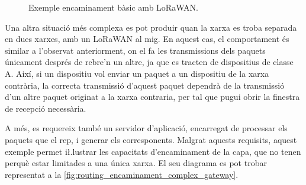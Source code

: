 \documentclass{tfgitic}[2024/07/01]
\begin{document}
{\begin{figure}[h]
    \caption{Exemple encaminament bàsic amb  LoRaWAN.}
    \label{fig:routing_encaminament_basic_gateway}
\end{figure}

Una altra situació més complexa es pot produir quan la xarxa es troba separada en dues xarxes, amb un  LoRaWAN al mig. En aquest cas, el comportament és similar a l'observat anteriorment, on el  fa les transmissions dels paquets únicament després de rebre'n un altre, ja que es tracten de dispositius de classe A. Així, si un dispositiu vol enviar un paquet a un dispositiu de la xarxa contrària, la correcta transmissió d'aquest paquet dependrà de la transmissió d'un altre paquet originat a la xarxa contraria, per tal que pugui obrir la finestra de recepció necessària.

A més, es requereix també un servidor d'aplicació, encarregat de processar els paquets que el  rep, i generar els  corresponents. Malgrat aquests requisits, aquest exemple permet i\l.lustrar les capacitats d'encaminament de la capa, que no tenen perquè estar limitades a una única xarxa. El seu diagrama es pot trobar representat a la \autoref{fig:routing_encaminament_complex_gateway}.

}
\end{document}
